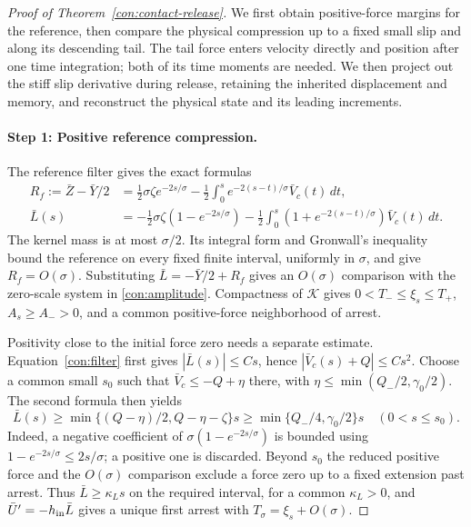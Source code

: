 \begin{proof}[Proof of Theorem~\ref{con:contact-release}]
We first obtain positive-force margins for the reference, then compare
the physical compression up to a fixed small slip and along its
descending tail.  The tail force enters velocity directly and position
after one time integration; both of its time moments are needed.
We then project out the stiff slip derivative during release, retaining
the inherited displacement and memory, and reconstruct the physical
state and its leading increments.

\paragraph{Step 1: Positive reference compression.}
The reference filter gives the exact formulas
\begin{equation}
 \begin{aligned}
 R_f:=\bar Z-\bar Y/2
 &=\tfrac12\sigma\zeta e^{-2s/\sigma}
   -\tfrac12\int_0^s e^{-2(s-t)/\sigma}\bar V_c(t)\,dt,\\
 \bar L(s)&=-\tfrac12\sigma\zeta(1-e^{-2s/\sigma})
 -\tfrac12\int_0^s(1+e^{-2(s-t)/\sigma})\bar V_c(t)\,dt.
 \end{aligned}
 \label{con:filter}
\end{equation}
The kernel mass is at most $\sigma/2$.  Its integral form and
Gronwall's inequality bound the reference on every fixed finite
interval, uniformly in $\sigma$, and give $R_f=O(\sigma)$.
Substituting $\bar L=-\bar Y/2+R_f$ gives an $O(\sigma)$ comparison
with the zero-scale system in \eqref{con:amplitude}.  Compactness of
$\mathcal K$ gives $0<T_-\le\xi_s\le T_+$, $A_s\ge A_->0$, and a
common positive-force neighborhood of arrest.

Positivity close to the initial force zero needs a separate estimate.
Equation~\eqref{con:filter} first gives $|\bar L(s)|\le Cs$, hence
$|\bar V_c(s)+Q|\le Cs^2$.  Choose a common small $s_0$ such that
$\bar V_c\le-Q+\eta$ there, with
$\eta\le\min(Q_-/2,\gamma_0/2)$.  The second formula then yields
\begin{equation}
 \bar L(s)\ge
 \min\{(Q-\eta)/2,Q-\eta-\zeta\}s
 \ge\min\{Q_-/4,\gamma_0/2\}s\quad(0<s\le s_0).
 \label{con:initial-positive}
\end{equation}
Indeed, a negative coefficient of $\sigma(1-e^{-2s/\sigma})$ is
bounded using $1-e^{-2s/\sigma}\le2s/\sigma$; a positive one is
discarded.  Beyond $s_0$ the reduced positive force and the
$O(\sigma)$ comparison exclude a force zero up to a fixed extension
past arrest.  Thus $\bar L\ge\kappa_Ls$ on the required interval, for a common
$\kappa_L>0$, and
$\bar U'=-h_{\rm in}\bar L$ gives a unique first arrest with
$T_\sigma=\xi_s+O(\sigma)$.


\end{proof}
